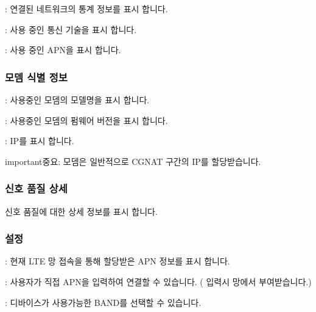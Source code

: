 \documentclass[letterpaper,10pt,english]{sphinxmanual}
\begin{document}
\sphinxAtStartPar
{} : 연결된 네트워크의 통계 정보를 표시 합니다.

\sphinxAtStartPar
{} : 사용 중인 통신 기술을 표시 합니다.

\sphinxAtStartPar
{} : 사용 중인 APN을 표시 합니다.


\subsubsection{모뎀 식별 정보}
\label{\detokenize{main_menu/modem:id4}}
\noindent{}

\sphinxAtStartPar
{} : 사용중인 모뎀의 모델명을 표시 합니다.

\sphinxAtStartPar
{} :   사용중인 모뎀의 펌웨어 버전을 표시 합니다.

\sphinxAtStartPar
{} :   IP를 표시 합니다.

\begin{sphinxadmonition}{important}{중요:}
\sphinxAtStartPar
모뎀은 일반적으로 CGNAT 구간의 IP를 할당받습니다.
\end{sphinxadmonition}


\subsubsection{신호 품질 상세}
\label{\detokenize{main_menu/modem:id5}}
\noindent{}

\sphinxAtStartPar
신호 품질에 대한 상세 정보를 표시 합니다.


\subsubsection{설정}
\label{\detokenize{main_menu/modem:id6}}
\noindent{}

\sphinxAtStartPar
{} : 현재 LTE 망 접속을 통해 할당받은 APN 정보를 표시 합니다.

\sphinxAtStartPar
{} : 사용자가 직접 APN을 입력하여 연결할 수 있습니다. ( 입력시 망에서 부여받습니다.)

\sphinxAtStartPar
{} : 디바이스가 사용가능한 BAND를 선택할 수 있습니다.
\end{document}
